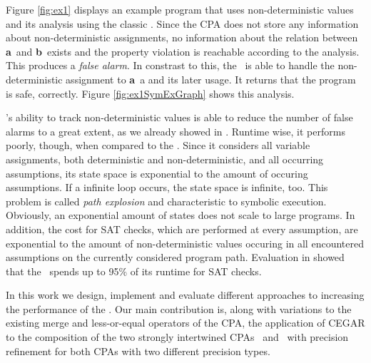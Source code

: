 Figure \ref{fig:ex1} displays an example program that uses non-deterministic values and its analysis using the classic .
Since the CPA does not store any information about non-deterministic assignments, no information about the relation between \textbf{a}\ and \textbf{b}\ exists and the property violation is reachable according to the analysis. This produces a \emph{false alarm}.
In constrast to this, the \symbolicExecutionCPA\ is able to handle the non-deterministic assignment to \textbf{a}\ a and its later usage. It returns that the program is safe, correctly.
Figure \ref{fig:ex1SymExGraph} shows this analysis. 

\SymbolicExecutionCPA's ability to track non-deterministic values is able to reduce the number of false alarms to a great extent, as we already showed in \cite{Lemberger2015}.
Runtime wise, it performs poorly, though, when compared to the .
Since it considers all variable assignments, both deterministic and non-deterministic, and all occurring assumptions, its state space is exponential to the amount of occuring assumptions.
If a infinite loop occurs, the state space is infinite, too.
This problem is called \emph{path explosion} and characteristic to symbolic execution.\cite{Anand2008}
Obviously, an exponential amount of states does not scale to large programs.
In addition, the cost for SAT checks, which are performed at every assumption, are exponential to the amount of non-deterministic values occuring in all encountered assumptions on the currently considered program path.
Evaluation in \cite{Lemberger2015} showed that the \symbolicExecutionCPA\ spends up to 95\% of its runtime for SAT checks.

In this work we design, implement and evaluate different approaches to increasing the performance of the \symbolicExecutionCPA.
Our main contribution is, along with variations to the existing merge and less-or-equal operators of the CPA,
the application of CEGAR \cite{Clarke2003} to the composition of the two strongly intertwined CPAs \symbolicValueAnalysisCPA\ and \constraintsCPA\ with precision refinement for both CPAs
with two different precision types.

